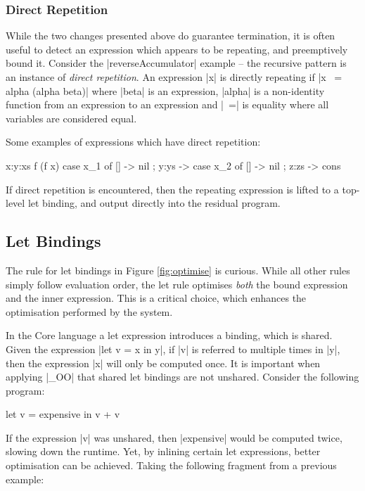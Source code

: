 \documentclass{llncs}
\begin{document}
\subsubsection{Direct Repetition}

While the two changes presented above do guarantee termination, it is often useful to detect an expression which appears to be repeating, and preemptively bound it. Consider the |reverseAccumulator| example -- the recursive pattern is an instance of \textit{direct repetition}. An expression |x| is directly repeating if |x ~= alpha (alpha beta)| where |beta| is an expression, |alpha| is a non-identity function from an expression to an expression and |~=| is equality where all variables are considered equal.

Some examples of expressions which have direct repetition:

\begin{code}
x:y:xs
f (f x)
case x_1 of {[] -> nil ; y:ys -> case x_2 of {[] -> nil ; z:zs -> cons}}
\end{code}

If direct repetition is encountered, then the repeating expression is lifted to a top-level let binding, and output directly into the residual program.

\subsection{Let Bindings}
\label{sec:let}

The rule for let bindings in Figure \ref{fig:optimise} is curious. While all other rules simply follow evaluation order, the let rule optimises \textit{both} the bound expression and the inner expression. This is a critical choice, which enhances the optimisation performed by the system.

In the Core language a let expression introduces a binding, which is shared. Given the expression |let v = x in y|, if |v| is referred to multiple times in |y|, then the expression |x| will only be computed once. It is important when applying |_OO| that shared let bindings are not unshared. Consider the following program:

\begin{code}
let v = expensive
in v + v
\end{code}

If the expression |v| was unshared, then |expensive| would be computed twice, slowing down the runtime. Yet, by inlining certain let expressions, better optimisation can be achieved. Taking the following fragment from a previous example:
\end{document}
